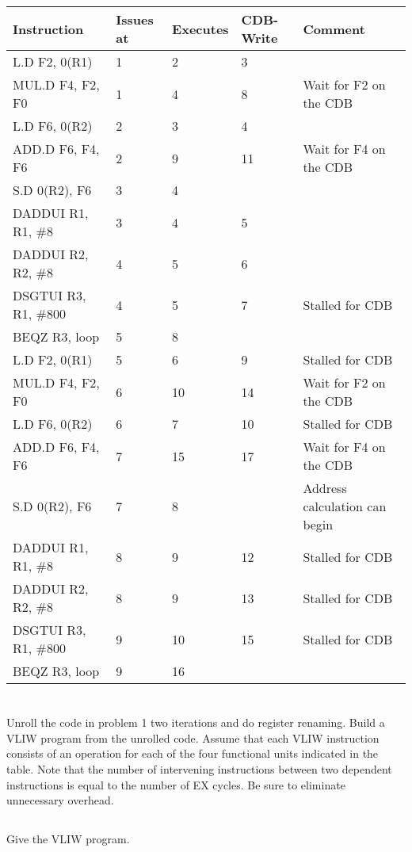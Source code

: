 \documentclass{article}
\begin{document}
\vspace{5mm}
\begin{tabular}{|l|p{2cm}|p{2cm}|p{2cm}|l|}
\hline 
\textbf{Instruction} & \textbf{Issues at} & \textbf{Executes} & \textbf{CDB-Write} & \textbf{Comment} \\
\hline
L.D F2, 0(R1) & 1 & 2 & 3 & \\
MUL.D F4, F2, F0 & 1 & 4 & 8 & Wait for F2 on the CDB \\
L.D F6, 0(R2) & 2 & 3 & 4 & \\
ADD.D F6, F4, F6 & 2 & 9 & 11 & Wait for F4 on the CDB\\ 
S.D 0(R2), F6 & 3 & 4 & & \\
DADDUI R1, R1, \#8 & 3 & 4 & 5& \\
DADDUI R2, R2, \#8 & 4 & 5 & 6 & \\ 
DSGTUI R3, R1, \#800 & 4 & 5 & 7 & Stalled for CDB \\
\hline
BEQZ R3, loop & 5 & 8 & & \\
\hline
L.D F2, 0(R1) & 5 & 6 & 9 & Stalled for CDB\\
MUL.D F4, F2, F0 & 6 & 10 & 14 & Wait for F2 on the CDB \\
L.D F6, 0(R2) & 6 & 7 & 10 & Stalled for CDB \\
ADD.D F6, F4, F6 & 7 & 15 & 17 & Wait for F4 on the CDB\\ 
S.D 0(R2), F6 & 7 & 8 & & Address calculation can begin\\
DADDUI R1, R1, \#8 & 8 & 9 & 12& Stalled for CDB\\
DADDUI R2, R2, \#8 & 8 & 9 & 13& Stalled for CDB\\ 
DSGTUI R3, R1, \#800 & 9 & 10 & 15 & Stalled for CDB\\
\hline
BEQZ R3, loop & 9 & 16 & & \\
\hline
\end{tabular}

\section{} Unroll the code in problem 1 two iterations and do register renaming.  Build a VLIW program from the unrolled code.  Assume that each VLIW instruction consists of an operation for each of the four functional units indicated in the table. Note that the number of intervening instructions between two dependent instructions is equal to the number of EX cycles.  Be sure to eliminate unnecessary overhead.
\subsection{}
Give the VLIW program.
\end{document}
